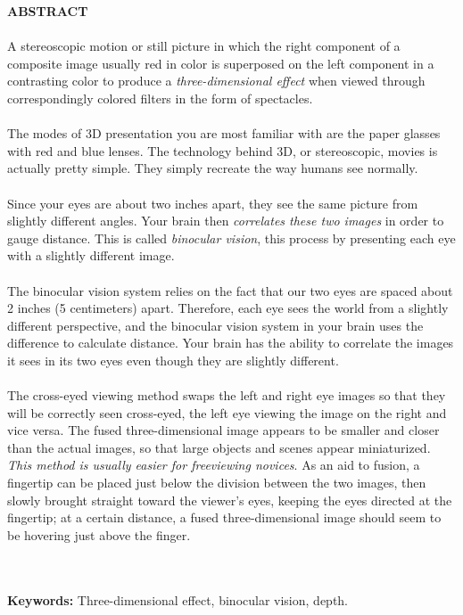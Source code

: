\begin{center}
\thispagestyle{empty}
\vspace{2cm}
\LARGE{\textbf{ABSTRACT}}\\[1.0cm]
\end{center}
\thispagestyle{empty}
\large{\paragraph{}A stereoscopic motion or still picture in which the right component of a composite image usually red in color is superposed on the left component in a contrasting color to produce a \emph{three-dimensional effect} when viewed through correspondingly colored filters in the form of spectacles.}
\large{\paragraph{}
	The modes of 3D presentation you are most familiar with are the paper glasses with red and blue lenses. The technology behind 3D, or stereoscopic, movies is actually pretty simple. They simply recreate the way humans see normally.}
\large{\paragraph{}
	Since your eyes are about two inches apart, they see the same picture from slightly different angles. Your brain then \emph{correlates these two images} in order to gauge distance. This is called \emph{binocular vision}, this process by presenting each eye with a slightly different image.}
\large{\paragraph{}The binocular vision system relies on the fact that our two eyes are spaced about 2 inches (5 centimeters) apart. Therefore, each eye sees the world from a slightly different perspective, and the binocular vision system in your brain uses the difference to calculate distance. Your brain has the ability to correlate the images it sees in its two eyes even though they are slightly different.}
\large{\paragraph{}The cross-eyed viewing method swaps the left and right eye images so that they will be correctly seen cross-eyed, the left eye viewing the image on the right and vice versa. The fused three-dimensional image appears to be smaller and closer than the actual images, so that large objects and scenes appear miniaturized. \emph{This method is usually easier for freeviewing novices}. As an aid to fusion, a fingertip can be placed just below the division between the two images, then slowly brought straight toward the viewer's eyes, keeping the eyes directed at the fingertip; at a certain distance, a fused three-dimensional image should seem to be hovering just above the finger.}\\\\
\textbf{Keywords: } Three-dimensional effect, binocular vision, depth.